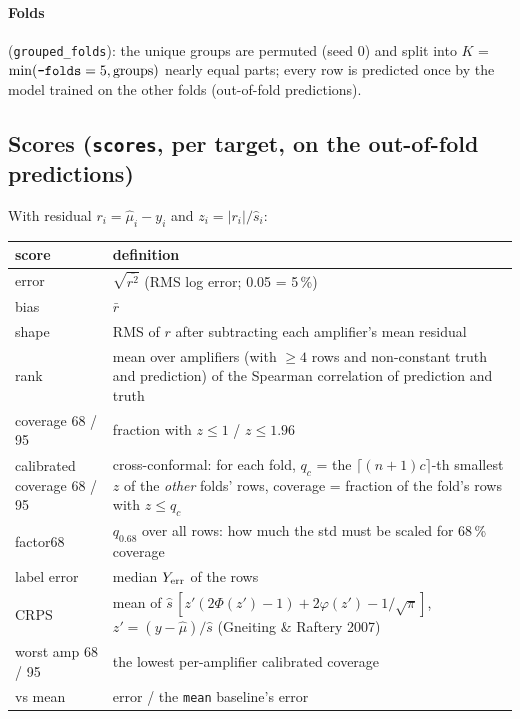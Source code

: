 \documentclass[10pt]{article}
\newcommand{\code}[1]{\texttt{#1}}
\begin{document}
\paragraph{Folds} (\code{grouped\_folds}): the unique groups are permuted (seed 0) and split into $K$ =
$\min(\text{\code{--folds}}=5, \text{groups})$ nearly equal parts; every row is predicted once by the model trained on the
other folds (out-of-fold predictions).

\subsection{Scores (\code{scores}, per target, on the out-of-fold predictions)}

With residual $r_i = \hat\mu_i - y_i$ and $z_i = |r_i|/\hat s_i$:
\begin{table}[H]
\centering\small
\begin{tabularx}{\textwidth}{>{\raggedright\arraybackslash}p{3.2cm}L}
\toprule
score & definition \\
\midrule
error & $\sqrt{\overline{r^2}}$ (RMS log error; 0.05 = 5\,\%) \\
bias & $\bar r$ \\
shape & RMS of $r$ after subtracting each amplifier's mean residual \\
rank & mean over amplifiers (with $\ge 4$ rows and non-constant truth and prediction) of the Spearman correlation of
prediction and truth \\
coverage 68 / 95 & fraction with $z \le 1$ / $z \le 1.96$ \\
calibrated coverage 68 / 95 & cross-conformal: for each fold, $q_c$ = the $\lceil (n+1)c\rceil$-th smallest $z$ of the
\emph{other} folds' rows, coverage = fraction of the fold's rows with $z \le q_c$ \\
factor68 & $q_{0.68}$ over all rows: how much the std must be scaled for 68\,\% coverage \\
label error & median $Y_{\rm err}$ of the rows \\
CRPS & mean of $\hat s\,[z'(2\Phi(z') - 1) + 2\varphi(z') - 1/\sqrt\pi]$, $z' = (y - \hat\mu)/\hat s$ (Gneiting \& Raftery 2007) \\
worst amp 68 / 95 & the lowest per-amplifier calibrated coverage \\
vs mean & error / the \code{mean} baseline's error \\
\bottomrule
\end{tabularx}
\end{table}
\end{document}
